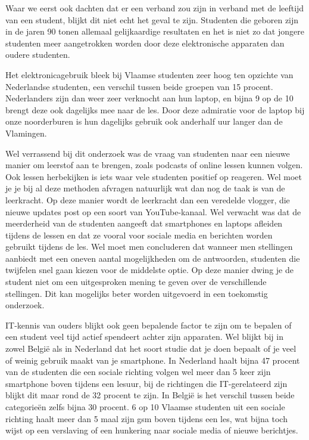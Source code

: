 Waar we eerst ook dachten dat er een verband zou zijn in verband met de leeftijd van een student, blijkt dit niet echt het geval te zijn. Studenten die geboren zijn in de jaren 90 tonen allemaal gelijkaardige resultaten en het is niet zo dat jongere studenten meer aangetrokken worden door deze elektronische apparaten dan oudere studenten.

Het elektronicagebruik bleek bij Vlaamse studenten zeer hoog ten opzichte van Nederlandse studenten, een verschil tussen beide groepen van 15 procent. Nederlanders zijn dan weer zeer verknocht aan hun laptop, en bijna 9 op de 10 brengt deze ook dagelijks mee naar de les. Door deze admiratie voor de laptop bij onze noorderburen is hun dagelijks gebruik ook anderhalf uur langer dan de Vlamingen. 

Wel verrassend bij dit onderzoek was de vraag van studenten naar een nieuwe manier om leerstof aan te brengen, zoals podcasts of online lessen kunnen volgen. Ook lessen herbekijken is iets waar vele studenten positief op reageren. Wel moet je je bij al deze methoden afvragen natuurlijk wat dan nog de taak is van de leerkracht. Op deze manier wordt de leerkracht dan een veredelde vlogger, die nieuwe updates post op een soort van YouTube-kanaal. Wel verwacht was dat de meerderheid van de studenten aangeeft dat smartphones en laptops afleiden tijdens de lessen en dat ze vooral voor sociale media en berichten worden gebruikt tijdens de les. Wel moet men concluderen dat wanneer men stellingen aanbiedt met een oneven aantal mogelijkheden om de antwoorden, studenten die twijfelen snel gaan kiezen voor de middelste optie. Op deze manier dwing je de student niet om een uitgesproken mening te geven over de verschillende stellingen. Dit kan mogelijks beter worden uitgevoerd in een toekomstig onderzoek.

IT-kennis van ouders blijkt ook geen bepalende factor te zijn om te bepalen of een student veel tijd actief spendeert achter zijn apparaten. Wel blijkt bij in zowel België als in Nederland dat het soort studie dat je doen bepaalt of je veel of weinig gebruik maakt van je smartphone. In Nederland haalt bijna 47 procent van de studenten die een sociale richting volgen wel meer dan 5 keer zijn smartphone boven tijdens een lesuur, bij de richtingen die IT-gerelateerd zijn blijkt dit maar rond de 32 procent te zijn. In België is het verschil tussen beide categorieën zelfs bijna 30 procent. 6 op 10 Vlaamse studenten uit een sociale richting haalt meer dan 5 maal zijn gsm boven tijdens een les, wat bijna toch wijst op een verslaving of een hunkering naar sociale media of nieuwe berichtjes.

